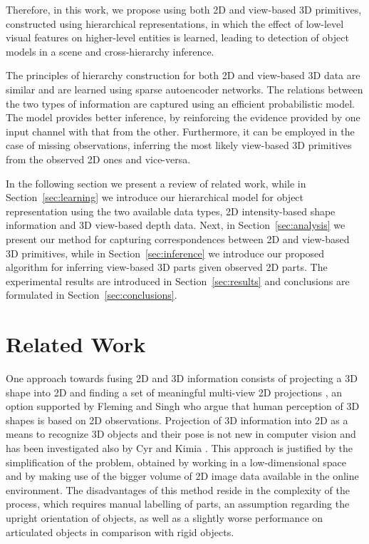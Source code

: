 \documentclass[runningheads]{llncs}
\begin{document}
Therefore, in this work, we propose using both 2D and view-based 3D primitives, constructed using hierarchical representations, in which the effect of low-level visual features on higher-level entities is learned, leading to detection of object models in a scene and cross-hierarchy inference. 

The principles of hierarchy construction for both 2D and view-based 3D data are similar and are learned using sparse autoencoder networks. The relations between the two types of information are captured using an efficient probabilistic model. The model provides better inference, by reinforcing the evidence provided by one input channel with that from the other. Furthermore, it can be employed in the case of missing observations, inferring the most likely view-based 3D primitives from the observed 2D ones and vice-versa. 

In the following section we present a review of related work, while in Section~\ref{sec:learning} we introduce our hierarchical model for object representation using the two available data types, 2D intensity-based shape information and 3D view-based depth data. Next, in Section~\ref{sec:analysis} we present our method for capturing correspondences between 2D and view-based 3D primitives, while in Section~\ref{sec:inference} we introduce our proposed algorithm for inferring view-based 3D parts given observed 2D parts. The experimental results are introduced in Section~\ref{sec:results} and conclusions are formulated in Section~\ref{sec:conclusions}.

\section{Related Work}
\label{sec:related_work}  

One approach towards fusing 2D and 3D information consists of projecting a 3D shape into 2D and finding a set of meaningful multi-view 2D projections \cite{WangGWC0C13}, an option supported by Fleming and Singh \cite{Fleming2009} who argue that human perception of 3D shapes is based on 2D observations. Projection of 3D information into 2D as a means to recognize 3D objects and their pose is not new in computer vision and has been investigated also by Cyr and Kimia \cite{Cyr2001}. This approach is justified by the simplification of the problem, obtained by working in a low-dimensional space and by making use of the bigger volume of 2D image data available in the online environment. The disadvantages of this method reside in the complexity of the process, which requires manual labelling of parts, an assumption regarding the upright orientation of objects, as well as a slightly worse performance on articulated objects in comparison with rigid objects.
\end{document}
